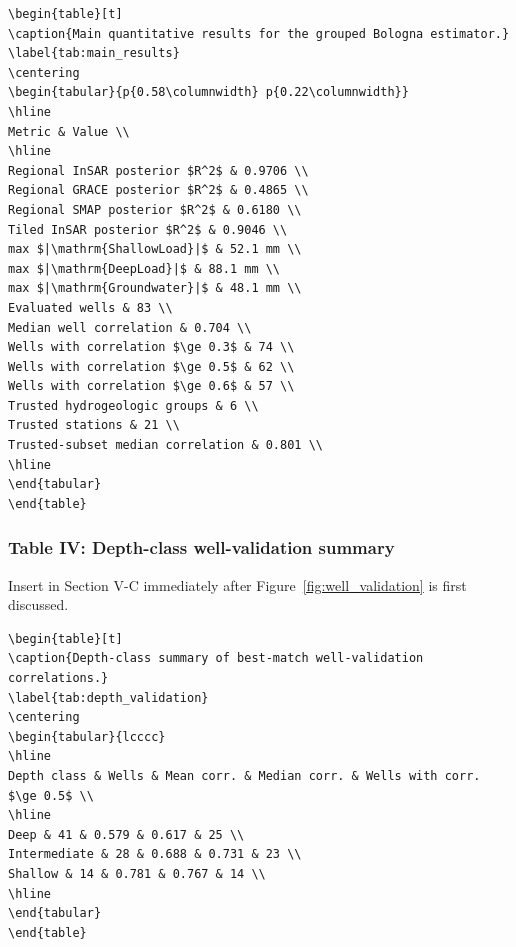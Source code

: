 \begin{verbatim}
\begin{table}[t]
\caption{Main quantitative results for the grouped Bologna estimator.}
\label{tab:main_results}
\centering
\begin{tabular}{p{0.58\columnwidth} p{0.22\columnwidth}}
\hline
Metric & Value \\
\hline
Regional InSAR posterior $R^2$ & 0.9706 \\
Regional GRACE posterior $R^2$ & 0.4865 \\
Regional SMAP posterior $R^2$ & 0.6180 \\
Tiled InSAR posterior $R^2$ & 0.9046 \\
max $|\mathrm{ShallowLoad}|$ & 52.1 mm \\
max $|\mathrm{DeepLoad}|$ & 88.1 mm \\
max $|\mathrm{Groundwater}|$ & 48.1 mm \\
Evaluated wells & 83 \\
Median well correlation & 0.704 \\
Wells with correlation $\ge 0.3$ & 74 \\
Wells with correlation $\ge 0.5$ & 62 \\
Wells with correlation $\ge 0.6$ & 57 \\
Trusted hydrogeologic groups & 6 \\
Trusted stations & 21 \\
Trusted-subset median correlation & 0.801 \\
\hline
\end{tabular}
\end{table}
\end{verbatim}

\subsubsection*{Table IV: Depth-class well-validation summary}
Insert in Section V-C immediately after Figure~\ref{fig:well_validation} is first discussed.

\begin{verbatim}
\begin{table}[t]
\caption{Depth-class summary of best-match well-validation correlations.}
\label{tab:depth_validation}
\centering
\begin{tabular}{lcccc}
\hline
Depth class & Wells & Mean corr. & Median corr. & Wells with corr. $\ge 0.5$ \\
\hline
Deep & 41 & 0.579 & 0.617 & 25 \\
Intermediate & 28 & 0.688 & 0.731 & 23 \\
Shallow & 14 & 0.781 & 0.767 & 14 \\
\hline
\end{tabular}
\end{table}
\end{verbatim}

